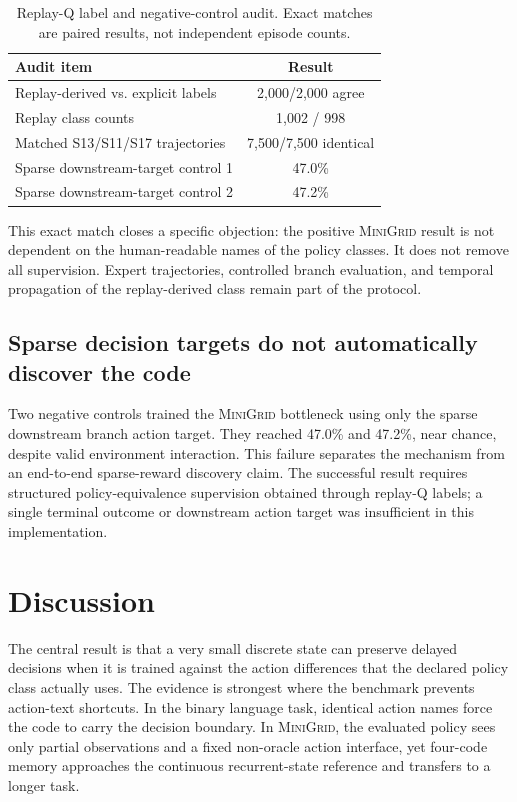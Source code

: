 \documentclass[11pt]{article}
\newcommand{\minigrid}{\textsc{MiniGrid}}
\begin{document}
\begin{table}[t]
\centering
\caption{Replay-Q label and negative-control audit. Exact matches are paired results, not independent episode counts.}
\label{tab:audit}
\begin{tabular}{@{}lc@{}}
\toprule
Audit item & Result\\
\midrule
Replay-derived vs. explicit labels & 2,000/2,000 agree\\
Replay class counts & 1,002 / 998\\
Matched S13/S11/S17 trajectories & 7,500/7,500 identical\\
Sparse downstream-target control 1 & 47.0\%\\
Sparse downstream-target control 2 & 47.2\%\\
\bottomrule
\end{tabular}
\end{table}

This exact match closes a specific objection: the positive \minigrid{} result is not dependent on the human-readable names of the policy classes. It does not remove all supervision. Expert trajectories, controlled branch evaluation, and temporal propagation of the replay-derived class remain part of the protocol.

\subsection{Sparse decision targets do not automatically discover the code}
Two negative controls trained the \minigrid{} bottleneck using only the sparse downstream branch action target. They reached 47.0\% and 47.2\%, near chance, despite valid environment interaction. This failure separates the mechanism from an end-to-end sparse-reward discovery claim. The successful result requires structured policy-equivalence supervision obtained through replay-Q labels; a single terminal outcome or downstream action target was insufficient in this implementation.

\section{Discussion}
The central result is that a very small discrete state can preserve delayed decisions when it is trained against the action differences that the declared policy class actually uses. The evidence is strongest where the benchmark prevents action-text shortcuts. In the binary language task, identical action names force the code to carry the decision boundary. In \minigrid{}, the evaluated policy sees only partial observations and a fixed non-oracle action interface, yet four-code memory approaches the continuous recurrent-state reference and transfers to a longer task.
\end{document}
